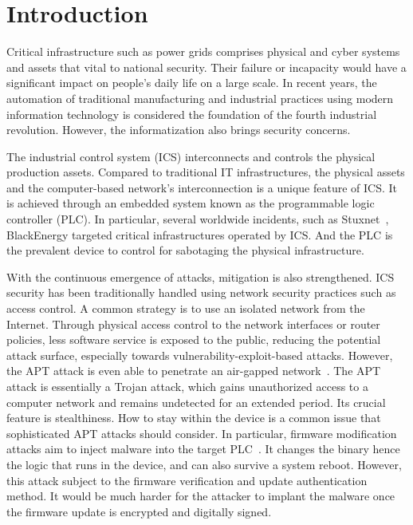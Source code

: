 \section{Introduction}
\label{sec:implant-introduction}


Critical infrastructure such as power grids comprises physical and cyber systems and assets that vital to national security. Their failure or incapacity would have a significant impact on people's daily life on a large scale. In recent years, the automation of traditional manufacturing and industrial practices using modern information technology is considered the foundation of the fourth industrial revolution.  However, the informatization also brings security concerns. 

The industrial control system (ICS) interconnects and controls the physical production assets.  Compared to traditional IT infrastructures, the physical assets and the computer-based network's interconnection is a unique feature of ICS. It is achieved through an embedded system known as the programmable logic controller (PLC). In particular, several worldwide incidents, such as Stuxnet~\cite{langner2011stuxnet}, BlackEnergy targeted critical infrastructures operated by ICS. And the PLC is the prevalent device to control for sabotaging the physical infrastructure.

With the continuous emergence of attacks, mitigation is also strengthened. ICS security has been traditionally handled using network security practices such as access control. A common strategy is to use an isolated network from the Internet. Through physical access control to the network interfaces or router policies, less software service is exposed to the public, reducing the potential attack surface, especially towards vulnerability-exploit-based attacks. However, the APT attack is even able to penetrate an air-gapped network~\cite{langner2011stuxnet}. The APT attack is essentially a Trojan attack, which gains unauthorized access to a computer network and remains undetected for an extended period. Its crucial feature is stealthiness. How to stay within the device is a common issue that sophisticated APT attacks should consider. In particular, firmware modiﬁcation attacks aim to inject malware into the target PLC~\cite{garcia2017hey}.  It changes the binary hence the logic that runs in the device, and can also survive a system reboot. However, this attack subject to the firmware verification and update authentication method. It would be much harder for the attacker to implant the malware once the firmware update is encrypted and digitally signed. 

